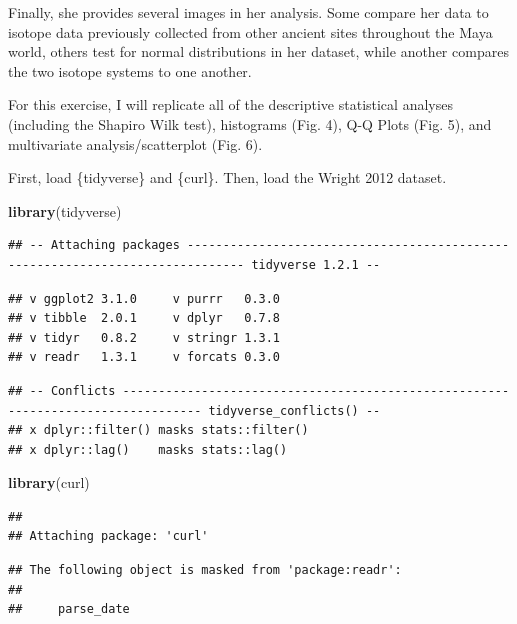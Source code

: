 \documentclass[]{article}
\newenvironment{Shaded}{\begin{snugshade}}{\end{snugshade}}
\newcommand{\KeywordTok}[1]{\textcolor[rgb]{0.13,0.29,0.53}{\textbf{#1}}}
\newcommand{\NormalTok}[1]{#1}
\begin{document}
Finally, she provides several images in her analysis. Some compare her
data to isotope data previously collected from other ancient sites
throughout the Maya world, others test for normal distributions in her
dataset, while another compares the two isotope systems to one another.

For this exercise, I will replicate all of the descriptive statistical
analyses (including the Shapiro Wilk test), histograms (Fig. 4), Q-Q
Plots (Fig. 5), and multivariate analysis/scatterplot (Fig. 6).

First, load \{tidyverse\} and \{curl\}. Then, load the Wright 2012
dataset.

\begin{Shaded}
\begin{Highlighting}[]
\KeywordTok{library}\NormalTok{(tidyverse)}
\end{Highlighting}
\end{Shaded}

\begin{verbatim}
## -- Attaching packages ------------------------------------------------------------------------------ tidyverse 1.2.1 --
\end{verbatim}

\begin{verbatim}
## v ggplot2 3.1.0     v purrr   0.3.0
## v tibble  2.0.1     v dplyr   0.7.8
## v tidyr   0.8.2     v stringr 1.3.1
## v readr   1.3.1     v forcats 0.3.0
\end{verbatim}

\begin{verbatim}
## -- Conflicts --------------------------------------------------------------------------------- tidyverse_conflicts() --
## x dplyr::filter() masks stats::filter()
## x dplyr::lag()    masks stats::lag()
\end{verbatim}

\begin{Shaded}
\begin{Highlighting}[]
\KeywordTok{library}\NormalTok{(curl)}
\end{Highlighting}
\end{Shaded}

\begin{verbatim}
## 
## Attaching package: 'curl'
\end{verbatim}

\begin{verbatim}
## The following object is masked from 'package:readr':
## 
##     parse_date
\end{verbatim}
\end{document}
